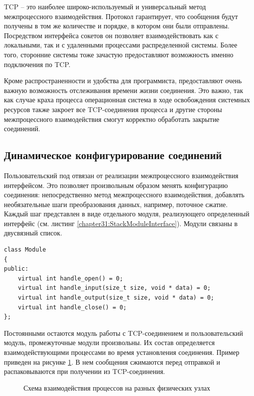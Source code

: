 TCP -- это наиболее широко-используемый и универсальный метод межпроцессного взаимодействия. Протокол гарантирует, что сообщения будут получены в том же количестве и порядке, в котором они были отправлены. Посредством интерфейса сокетов он позволяет взаимодействовать как с локальными, так и с удаленными процессами распределенной системы. Более того, сторонние системы тоже зачастую предоставляют возможность именно подключения по TCP.

Кроме распространенности и удобства для программиста, предоставляют очень важную возможность отслеживания времени жизни соединения. Это важно, так как случае краха процесса операционная система в ходе освобождения системных ресурсов также закроет все TCP-соединения процесса и другие стороны межпроцессного взаимодействия смогут корректно обработать закрытие соединений.

\subsection{Динамическое конфигурирование соединений}

Пользовательский под отвязан от реализации межпроцессного взаимодействия интерфейсом. Это позволяет произвольным образом менять конфигурацию соединения: непосредственно метод межпроцессного взаимодействия, добавлять необязательные шаги преобразования данных, например, поточное сжатие. Каждый шаг представлен в виде отдельного модуля, реализующего определенный интерфейс (см. листинг \ref{chapter31:StackModuleInterface}). Модули связаны в двусвязный список.

\begin{lstlisting}[float=!h,caption={Интерфейс низкоуровневого обработчика соединений на C++},label={chapter31:StackModuleInterface}]
class Module
{
public:
	virtual int handle_open() = 0;
	virtual int handle_input(size_t size, void * data) = 0;
	virtual int handle_output(size_t size, void * data) = 0;
	virtual int handle_close() = 0;
};
\end{lstlisting}

Постоянными остаются модуль работы с TCP-соединением и пользовательский модуль, промежуточные модули произвольны. Их состав определяется взаимодействующими процессами во время установления соединения. Пример приведен на рисунке \ref{chapter31:ModuleStackExample}. В нем сообщения сжимаются перед отправкой и распаковываются при получении из TCP-соединения.

\begin{figure}[!h]
\caption{Схема взаимодействия процессов на разных физических узлах}
\label{chapter31:ModuleStackExample}
\end{figure}

